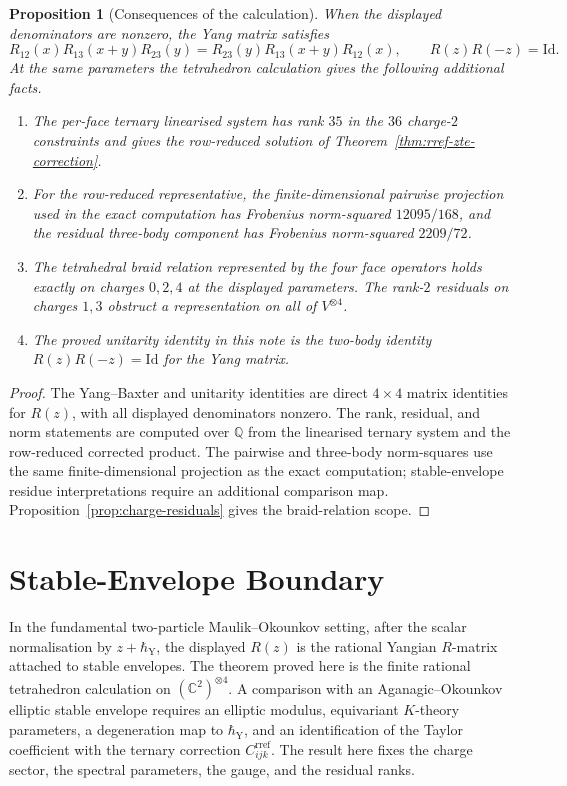 \documentclass[11pt]{amsart}
\newtheorem{proposition}[theorem]{Proposition}
\theoremstyle{definition}
\theoremstyle{remark}
\newcommand{\C}{\mathbb{C}}
\newcommand{\Q}{\mathbb{Q}}
\begin{document}
\begin{proposition}[Consequences of the calculation]
\label{prop:ybe-unitarity-braiding}
When the displayed denominators are nonzero, the Yang matrix satisfies
\[
  R_{12}(x)R_{13}(x+y)R_{23}(y)
  =
  R_{23}(y)R_{13}(x+y)R_{12}(x),
  \qquad
  R(z)R(-z)=\mathrm{Id}.
\]
At the same parameters the tetrahedron calculation gives the following
additional facts.
\begin{enumerate}[label=\textup{(\roman*)}]
\item The per-face ternary linearised system has rank $35$ in the
$36$ charge-$2$ constraints and gives the row-reduced solution of
Theorem~\ref{thm:rref-zte-correction}.
\item For the row-reduced representative, the finite-dimensional
pairwise projection used in the exact computation has Frobenius
norm-squared $12095/168$, and the residual three-body component has
Frobenius norm-squared $2209/72$.
\item The tetrahedral braid relation represented by the four face
operators holds exactly on charges $0,2,4$ at the displayed parameters.
The rank-$2$ residuals on charges $1,3$ obstruct a representation on
all of $V^{\otimes 4}$.
\item The proved unitarity identity in this note is the two-body identity
$R(z)R(-z)=\mathrm{Id}$ for the Yang matrix.
\end{enumerate}
\end{proposition}

\begin{proof}
The Yang--Baxter and unitarity identities are direct $4\times 4$ matrix
identities for $R(z)$, with all displayed denominators nonzero.  The
rank, residual, and norm statements are computed over $\Q$ from the
linearised ternary system and the row-reduced corrected product.  The
pairwise and three-body norm-squares use the same finite-dimensional
projection as the exact computation; stable-envelope residue
interpretations require an additional comparison map.
Proposition~\ref{prop:charge-residuals} gives the braid-relation scope.
\end{proof}

\section{Stable-Envelope Boundary}

In the fundamental two-particle Maulik--Okounkov setting, after the
scalar normalisation by $z+\hbar_{\mathrm{Y}}$, the displayed $R(z)$ is
the rational Yangian $R$-matrix attached to stable envelopes.  The
theorem proved here is the finite rational tetrahedron calculation on
$(\C^2)^{\otimes 4}$.  A comparison with an Aganagic--Okounkov elliptic
stable envelope requires an elliptic modulus, equivariant $K$-theory
parameters, a degeneration map to $\hbar_{\mathrm{Y}}$, and an
identification of the Taylor coefficient with the ternary correction
$C^{\mathrm{rref}}_{ijk}$.  The result here fixes the charge sector, the
spectral parameters, the gauge, and the residual ranks.
\end{document}
